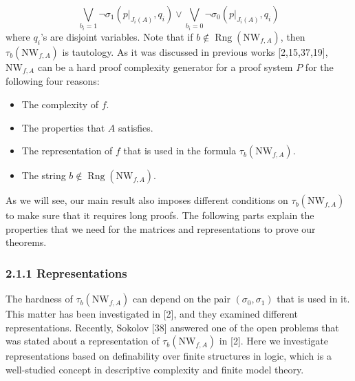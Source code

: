\[\bigvee_{b_i=1}\neg\sigma_1(p|_{J_i(A)},q_i)\vee\bigvee_{b_i=0}\neg\sigma_0(p|_{J_i(A)},q_i)\]
where $q_i$'s are disjoint variables. Note that if $b\notin\operatorname{Rng}(\mathrm{NW}_{f,A})$, then $\tau_b(\mathrm{NW}_{f,A})$ is tautology.
As it was discussed in previous works [2,15,37,19], $\mathrm{NW}_{f,A}$ can be a hard proof complexity generator for a proof system $P$ for the following four reasons:
\begin{itemize}
\item The complexity of $f$.
\item The properties that $A$ satisfies.
\item The representation of $f$ that is used in the formula $\tau_b(\mathrm{NW}_{f,A})$.
\item The string $b\notin\operatorname{Rng}(\mathrm{NW}_{f,A})$.
\end{itemize}
As we will see, our main result also imposes different conditions on $\tau_b(\mathrm{NW}_{f,A})$ to make sure that it requires long proofs.
The following parts explain the properties that we need for the matrices and representations to prove our theorems.
\subsubsection*{2.1.1 Representations}
The hardness of $\tau_b(\mathrm{NW}_{f,A})$ can depend on the pair $(\sigma_0,\sigma_1)$ that is used in it. This matter has been investigated in [2], and they examined different representations. Recently, Sokolov [38] answered one of the open problems that was stated about a representation of $\tau_b(\mathrm{NW}_{f,A})$ in [2]. Here we investigate representations based on definability over finite structures in logic, which is a well-studied concept in descriptive complexity and finite model theory.

